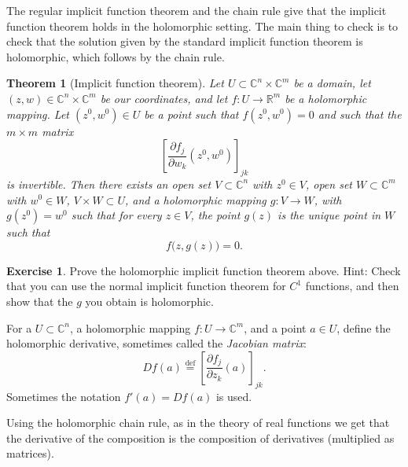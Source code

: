 \documentclass[12pt,openany]{book}
\newcommand{\C}{{\mathbb{C}}}
\newcommand{\R}{{\mathbb{R}}}
\newcommand{\myindex}[1]{#1\index{#1}}
\theoremstyle{plain}
\newtheorem{thm}{Theorem}[section]
\theoremstyle{remark}
\theoremstyle{definition}
\newenvironment{exbox}{%
    \def\FrameCommand{\vrule width 1pt \relax\hspace {10pt}}%
    \MakeFramed {\advance \hsize -\width \FrameRestore }%
}{%
    \endMakeFramed
}
\theoremstyle{exercise}
\newtheorem{exercise}{Exercise}[section]
\theoremstyle{example}
\begin{document}
The regular implicit function theorem and the chain rule
give that the implicit function theorem holds in the holomorphic setting.
The main thing to check is to check that the solution given by the
standard implicit function theorem is holomorphic, which follows by the
chain rule.

\begin{thm}[Implicit function theorem] \label{thm:ift}
Let $U \subset \C^{n} \times \C^{m}$ be a domain, let  $(z,w) \in \C^n \times
\C^m$ be our coordinates, and let $f \colon U \to \R^m$
be a holomorphic mapping.  Let $(z^0,w^0) \in U$ be a point such that
$f(z^0,w^0) = 0$ and such that the $m \times m$ matrix
\begin{equation*}
\left[
\frac{\partial f_j}{\partial w_k} (z^0,w^0)
\right]_{jk}
\end{equation*}
is invertible.
Then there exists an
open set $V \subset \C^n$ with $z^0 \in V$,
open set $W \subset \C^m$ with $w^0 \in W$,
$V \times W \subset U$,
and
a holomorphic
mapping $g \colon V \to W$, with $g(z^0) = w^0$
such that
for every $z \in V$, the point $g(z)$ is the unique point in $W$
such that
\begin{equation*}
f\bigl(z,g(z)\bigr) = 0 .
\end{equation*}
\end{thm}

\begin{exbox}
\begin{exercise}
Prove the holomorphic implicit function theorem above.
Hint: Check that you can use the normal implicit function theorem for $C^1$
functions, and then show that the $g$ you obtain is holomorphic.
\end{exercise}
\end{exbox}

For a $U \subset \C^n$, a holomorphic mapping $f \colon U \to \C^m$,
and a point $a \in U$,
define the holomorphic derivative, sometimes called the
\emph{\myindex{Jacobian matrix}}:
\begin{equation*}
Df(a) \overset{\text{def}}{=}
\left[
\frac{\partial f_j}{\partial z_k} (a)
\right]_{jk} .
\end{equation*}
Sometimes the notation $f'(a) = Df(a)$ is used.

Using the holomorphic chain rule, as in the theory of real functions we get
that the derivative of the composition is the composition of derivatives
(multiplied as matrices).
\end{document}
